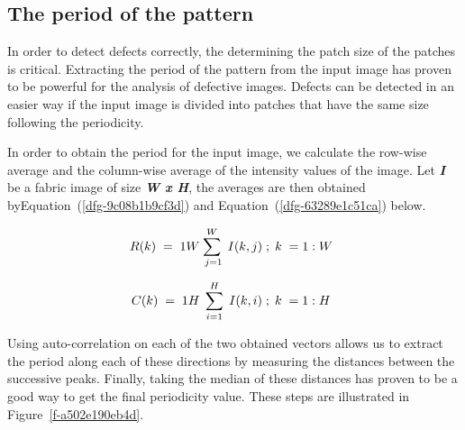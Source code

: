 \documentclass[3p,,preprint,review,12pt]{elsarticle}
\makeatletter
\def\fixFloatSize#1{}%
\makeatother
\begin{document}
\subsection{The period of the pattern}In order to detect defects correctly, the determining the patch size of the patches is critical. Extracting the period of the pattern from the input image has proven to be powerful for the analysis of defective images. Defects can be detected in an easier way if the input image is divided into patches that have the same size following the periodicity. 

In order to obtain the period for the input image, we calculate the row-wise average and the column-wise average of the intensity values of the image. Let \textbf{\textit{I}} be a fabric image of size \textbf{\textit{W x H}}, the averages are then obtained byEquation~(\ref{dfg-9c08b1b9cf3d}) and Equation~(\ref{dfg-63289e1c51ca}) below.


\let\saveeqnno\theequation
\let\savefrac\frac
\def\dispfrac{\displaystyle\savefrac}
\begin{eqnarray}
\let\frac\dispfrac
\gdef\theequation{3}
\let\theHequation\theequation
\label{dfg-9c08b1b9cf3d}
\begin{array}{@{}l}R(k)\;=\;\frac1W\sum_{\;j=1}^{W}\;I(k,j)\;;\;k\;=1:W\end{array}
\end{eqnarray}
\global\let\theequation\saveeqnno
\addtocounter{equation}{-1}\ignorespaces 
%
\let\saveeqnno\theequation
\let\savefrac\frac
\def\dispfrac{\displaystyle\savefrac}
\begin{eqnarray}
\let\frac\dispfrac
\gdef\theequation{4}
\let\theHequation\theequation
\label{dfg-63289e1c51ca}
\begin{array}{@{}l}C(k)\;=\;\frac1H\;\sum_{i=1}^{H}\;I(k,i)\;;\;k\;=1:H\end{array}
\end{eqnarray}
\global\let\theequation\saveeqnno
\addtocounter{equation}{-1}\ignorespaces 
Using auto-correlation on each of the two obtained vectors allows us to extract the period along each of these directions by measuring the distances between the successive peaks.  Finally, taking the median of these distances has proven to be a good way to get the final periodicity value. These steps are illustrated in Figure~\ref{f-a502e190eb4d}.


\bgroup
\fixFloatSize{Figures/Figure2.jpg}
\begin{figure*}[!htbp]
\centering \makeatletter{}
\makeatother 
\caption{{\textbf{(a)} Box-patterned defect-free image; \textbf{(b)} Row-wise average vector; \textbf{(c)} Column-wise average vector; \textbf{(d)} Auto-correlation for the row direction; \textbf{(e)} Successive peaks detection }}
\label{f-a502e190eb4d}
\end{figure*}
\egroup
\end{document}
